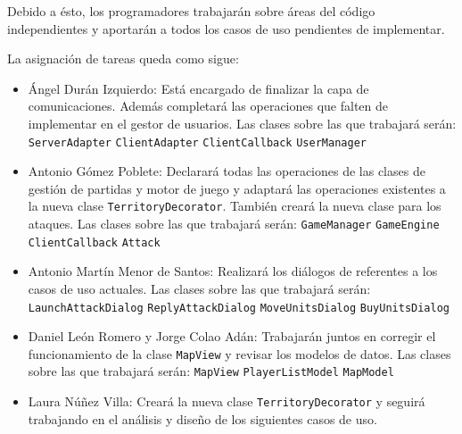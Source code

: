 \documentclass[a4paper,11pt,oneside]{article}
\begin{document}
Debido a ésto, los programadores trabajarán sobre áreas del código
independientes y aportarán a todos los casos de uso pendientes de implementar.

La asignación de tareas queda como sigue:

\begin{itemize}
\item Ángel Durán Izquierdo: Está encargado de finalizar la capa de
comunicaciones. Además completará las operaciones que falten de implementar en
el gestor de usuarios. Las clases sobre las que trabajará serán:
\subitem \texttt{ServerAdapter}
\subitem \texttt{ClientAdapter}
\subitem \texttt{ClientCallback}
\subitem \texttt{UserManager}

\item Antonio Gómez Poblete: Declarará todas las operaciones de las clases de
gestión de partidas y motor de juego y adaptará las operaciones existentes a
la nueva clase \texttt{TerritoryDecorator}. También creará la nueva clase
para los ataques. Las clases sobre las que trabajará serán:
\subitem \texttt{GameManager}
\subitem \texttt{GameEngine}
\subitem \texttt{ClientCallback}
\subitem \texttt{Attack}

\item Antonio Martín Menor de Santos: Realizará los diálogos de referentes a los
casos de uso actuales. Las clases sobre las que trabajará serán:
\subitem \texttt{LaunchAttackDialog}
\subitem \texttt{ReplyAttackDialog}
\subitem \texttt{MoveUnitsDialog}
\subitem \texttt{BuyUnitsDialog}

\item Daniel León Romero y Jorge Colao Adán: Trabajarán juntos en corregir el
funcionamiento de la clase \texttt{MapView} y revisar los modelos de datos. Las
clases sobre las que trabajará serán:
\subitem \texttt{MapView}
\subitem \texttt{PlayerListModel}
\subitem \texttt{MapModel}

\item Laura Núñez Villa: Creará la nueva clase \texttt{TerritoryDecorator} y
seguirá trabajando en el análisis y diseño de los siguientes casos de uso.
\end{itemize}
\end{document}
